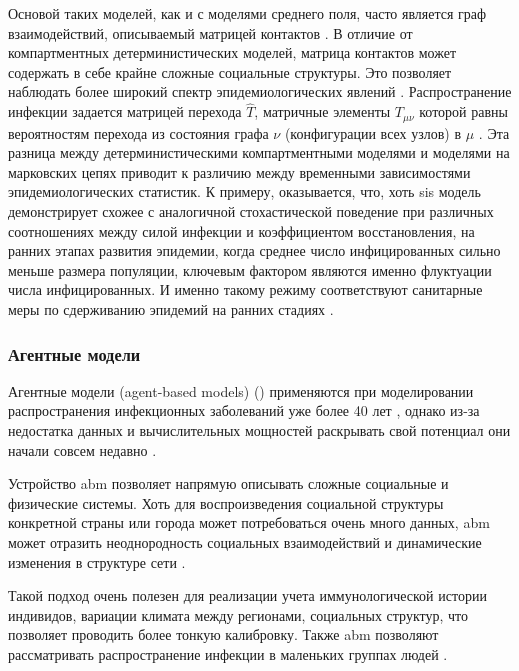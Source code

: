 \documentclass[a4paper,12pt]{article} %
\begin{document}
Основой таких моделей, как и с моделями среднего поля, часто является граф взаимодействий, описываемый матрицей контактов \cite{albert2002statistical}. В отличие от компартментных детерминистических моделей, матрица контактов может содержать в себе крайне сложные социальные структуры. Это позволяет наблюдать более широкий спектр эпидемиологических явлений \cite{pastor2015epidemic}. Распространение инфекции задается матрицей перехода $\hat{T}$, матричные элементы $T_{\mu\nu}$ которой равны вероятностям перехода из состояния графа $\nu$ (конфигурации всех узлов) в $\mu$ \cite{van1992stochastic}. Эта разница между детерминистическими компартментными моделями и моделями на марковских цепях приводит к различию между временными зависимостями эпидемиологических статистик. К примеру, оказывается, что, хоть \gls{sis} модель демонстрирует схожее с аналогичной стохастической поведение при различных соотношениях между силой инфекции и коэффициентом восстановления, на ранних этапах развития эпидемии, когда среднее число инфицированных сильно меньше размера популяции, ключевым фактором являются именно флуктуации числа инфицированных. И именно такому режиму соответствуют санитарные меры по сдерживанию эпидемий на ранних стадиях \cite{nakamura2017efficient}.

\subsubsection{Агентные модели}
Агентные модели (agent-based models) () применяются при моделировании распространения инфекционных заболеваний уже более 40 лет \cite{fox1971herd, elveback1976influmza}, однако из-за недостатка данных и вычислительных мощностей раскрывать свой потенциал они начали совсем недавно \cite{koopman2002controlling}.

Устройство \gls{abm} позволяет напрямую описывать сложные социальные и физические системы. Хоть для воспроизведения социальной структуры конкретной страны или города может потребоваться очень много данных, \gls{abm} может отразить неоднородность социальных взаимодействий и динамические изменения в структуре сети \cite{rakowski2010influenza}. 

Такой подход очень полезен для реализации учета иммунологической истории индивидов, вариации климата между регионами, социальных структур, что позволяет проводить более тонкую калибровку. Также \gls{abm} позволяют рассматривать распространение инфекции в маленьких группах людей \cite{rakowski2010influenza}.
\end{document}
